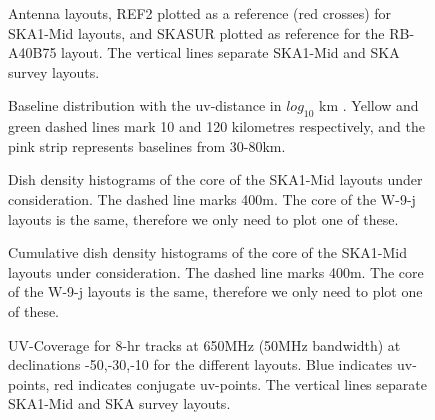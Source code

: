 \documentclass[sfheadings,a4paper,times,9pt,floats,floatfix]{article}
\begin{document}
\begin{figure}[H]
 \tiny{}
 \caption{Antenna layouts, REF2 plotted as a reference (red crosses) for SKA1-Mid layouts, and SKASUR
plotted as reference for the RB-A40B75 layout. The vertical lines separate SKA1-Mid and SKA
survey layouts.}\label{fig:lay}
\end{figure}
\begin{figure}[H]
 \tiny{}
 \caption{Baseline distribution with the uv-distance in $log_{10}$ km . Yellow and green dashed lines mark 10 and 120
kilometres respectively, and the pink strip represents baselines from 30-80km.}\label{fig:hist}
\end{figure}
\begin{figure}[H]
 \centering
 
 \caption{Dish density histograms of the core of the SKA1-Mid layouts under consideration. The dashed line marks 400m. The core
of the W-9-j layouts is the same, therefore we only need to plot one of these.}
\end{figure}
\begin{figure}[H]
 \centering
 
 \caption{Cumulative dish density histograms of the core of the SKA1-Mid layouts under consideration. The dashed line marks 400m.
The core of the W-9-j layouts is the same, therefore we only need to plot one of these.}
\end{figure}
\begin{figure}[H]
 \tiny{}
 \caption{UV-Coverage for 8-hr tracks at 650MHz (50MHz bandwidth) at declinations -50,-30,-10 for the different layouts. Blue
indicates uv-points, red indicates conjugate uv-points. The vertical lines separate SKA1-Mid and SKA
survey layouts.}\label{fig:uvcov}
\end{figure}
\end{document}
